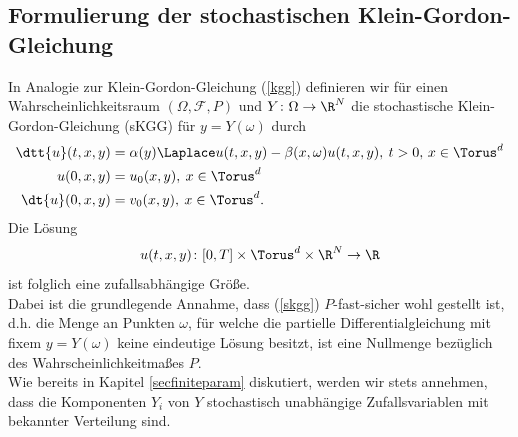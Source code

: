 \subsection{Formulierung der stochastischen Klein-Gordon-Gleichung}
In Analogie zur Klein-Gordon-Gleichung (\ref{kgg}) definieren wir für einen Wahrscheinlichkeitsraum $(\Omega,\mathcal{F},P)$ und $Y\colon\Omega\to\R^N$ die stochastische Klein-Gordon-Gleichung (sKGG) für $y=Y(\omega)$ durch
\begin{align}
\label{skgg}
\dtt{u}(t,x,y)&=\alpha(y) \Laplace u(t,x,y) - \beta(x,\omega)u(t,x,y), \: t>0, \, x\in \Torus^d\\
u(0,x,y)&=u_0(x,y), \: x\in \Torus^d\\
\dt{u}(0,x,y)&=v_0(x,y), \: x\in \Torus^d.
\end{align}
Die Lösung \[u(t,x,y)\colon [0,T]\times\Torus^d\times \R^N\to\R\] ist folglich eine zufallsabhängige Größe.\\
Dabei ist die grundlegende Annahme, dass (\ref{skgg}) $P$-fast-sicher wohl gestellt ist, d.h. die Menge an Punkten $\omega$, für welche die partielle Differentialgleichung mit fixem $y=Y(\omega)$ keine eindeutige Lösung besitzt, ist eine Nullmenge bezüglich des Wahrscheinlichkeitmaßes $P$.\\
Wie bereits in Kapitel \ref{secfiniteparam} diskutiert, werden wir stets annehmen, dass die Komponenten $Y_i$ von $Y$ stochastisch unabhängige Zufallsvariablen mit bekannter Verteilung sind.
